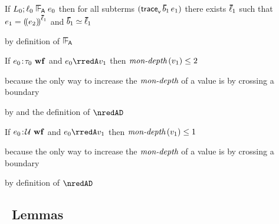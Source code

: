 \begin{corollary}
  If\/ $\sownerenv_0; \sowner_0 \sWLA \sexpr_0$
  then for all subterms\/ $(\ehist{\sblist_1}{\sexpr_1})$
  there exists\/ $\sownerlist_1$
  such that\/ $\sexpr_1 \eeq \obbars{\sexpr_2}{\sownerlist_1}$
  and\/ $\fbndeqowners{\sblist_1}{\sownerlist_1}$
\end{corollary}
\begin{lamportproof}
  by definition of $\sWLA$
\end{lamportproof}

\begin{theorem}\label{A-S-mon-limit}
  If\/ $e_0\!:\!\tau_0~\mathbf{wf}$
  and\/ $\sexpr_0 \rredA \svalue_1$
  then\/ $\textit{mon-depth}\,(v_1) \leq 2$
\end{theorem}{
\begin{lamportproof}
    \begin{pfproof}
      because the only way to increase the $\textit{mon-depth}$ of a value is by crossing
      a boundary
    \end{pfproof}
  \qedstep
    \begin{pfproof}
      by  and the definition of $\nredAD$
    \end{pfproof}
\end{lamportproof}}

\begin{theorem}\label{A-D-mon-limit}
  If\/ $e_0\!:\!{\mathcal U}~\mathbf{wf}$
  and\/ $\sexpr_0 \rredA \svalue_1$
  then\/ $\textit{mon-depth}\,(v_1) \leq 1$
\end{theorem}{
\begin{lamportproof}
    \begin{pfproof}
      because the only way to increase the $\textit{mon-depth}$ of a value is by crossing
      a boundary
    \end{pfproof}
  \qedstep
    \begin{pfproof}
      by definition of $\nredAD$
    \end{pfproof}
\end{lamportproof}}

\subsection{\Aname{}\ Lemmas}


